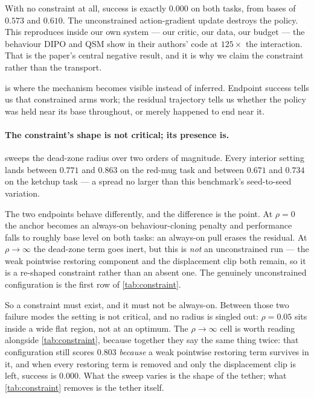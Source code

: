 With no constraint at all, success is exactly $0.000$ on both tasks, from
bases of $0.573$ and $0.610$. The unconstrained action-gradient update
destroys the policy. This reproduces inside our own system --- our critic,
our data, our budget --- the behaviour DIPO and QSM show in their authors'
code at $125\times$ the interaction. That is the paper's central negative
result, and it is why we claim the constraint rather than the transport.

 is where the mechanism becomes visible instead of
inferred. Endpoint success tells us that constrained arms work; the residual
trajectory tells us whether the policy was held near its base throughout, or
merely happened to end near it.

\paragraph{The constraint's shape is not critical; its presence is.}
 sweeps the dead-zone radius over two orders of
magnitude. Every interior setting lands between $0.771$ and $0.863$ on the red-mug task
and between $0.671$ and $0.734$ on the ketchup task --- a spread no larger than this
benchmark's seed-to-seed variation.

The two endpoints behave differently, and the difference is the point. At
$\rho{=}0$ the anchor becomes an always-on behaviour-cloning penalty and
performance falls to roughly base level on both tasks: an always-on pull
erases the residual. At $\rho{\to}\infty$ the dead-zone term goes inert,
but this is \emph{not} an unconstrained run --- the weak pointwise restoring
component and the displacement clip both remain, so it is a re-shaped
constraint rather than an absent one. The genuinely unconstrained
configuration is the first row of \cref{tab:constraint}.

So a constraint must exist, and it must not be always-on. Between those two
failure modes the setting is not critical, and no radius is singled out:
$\rho{=}0.05$ sits inside a wide flat region, not at an optimum. The
$\rho{\to}\infty$ cell is worth reading alongside \cref{tab:constraint},
because together they say the same thing twice: that configuration still
scores $0.803$ \emph{because} a weak pointwise restoring term survives in it,
and when every restoring term is removed and only the displacement clip is
left, success is $0.000$. What the sweep varies is the shape of the tether;
what \cref{tab:constraint} removes is the tether itself.



